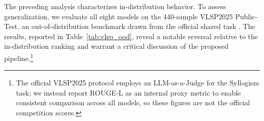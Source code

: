 The preceding analysis characterizes in-distribution behavior. To assess generalization, we evaluate all eight models on the 440-sample VLSP2025 Public-Test, an out-of-distribution benchmark drawn from the official shared task \parencite{le-etal-2025-overview}. The results, reported in Table~\ref{tab:vlsp_ood}, reveal a notable reversal relative to the in-distribution ranking and warrant a critical discussion of the proposed pipeline.\footnote{The official VLSP2025 protocol employs an LLM-as-a-Judge for the Syllogism task; we instead report ROUGE-L as an internal proxy metric to enable consistent comparison across all models, so these figures are not the official competition scores.}

\begin{table}[htbp]
\centering
\caption{Generalization Results on the 440-sample VLSP2025 Public-Test (Out-of-Distribution)}
\label{tab:vlsp_ood}
\end{table}

